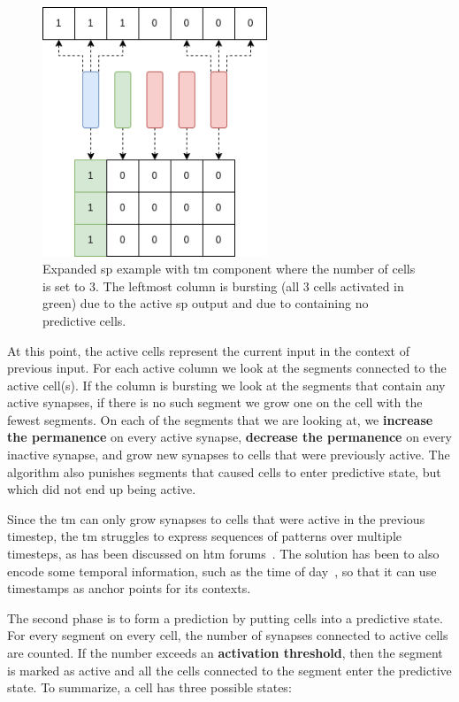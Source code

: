 \par
\begin{figure}[H]
    \centering
    \includegraphics[width=0.6\textwidth]{resources/related_works/tm_vis1.png}
    \caption[Temporal Memory Workings]{Expanded \gls*{sp} example with \gls*{tm} component where the number of cells is set to 3. The leftmost column is bursting (all 3 cells activated in green) due to the active \gls*{sp} output and due to containing no predictive cells.}
    \label{fig:tm_vis1}
\end{figure}
At this point, the active cells represent the current input in the context of previous input. For each active column we look at the segments connected to the active cell(s). If the column is bursting we look at the segments that contain any active synapses, if there is no such segment we grow one on the cell with the fewest segments. On each of the segments that we are looking at, we \textbf{increase the permanence} on every active synapse, \textbf{decrease the permanence} on every inactive synapse, and grow new synapses to cells that were previously active. The algorithm also punishes segments that caused cells to enter predictive state, but which did not end up being active.
\par
Since the \gls*{tm} can only grow synapses to cells that were active in the previous timestep, the \gls*{tm} struggles to express sequences of patterns over multiple timesteps, as has been discussed on \gls*{htm} forums~\cite{tm_sequence_problem}. The solution has been to also encode some temporal information, such as the time of day~\cite{AHMAD2017134,tm_sequence_problem}, so that it can use timestamps as anchor points for its contexts.
\par
The second phase is to form a prediction by putting cells into a predictive state. For every segment on every cell, the number of synapses connected to active cells are counted. If the number exceeds an \textbf{activation threshold}, then the segment is marked as active and all the cells connected to the segment enter the predictive state. To summarize, a cell has three possible states:
